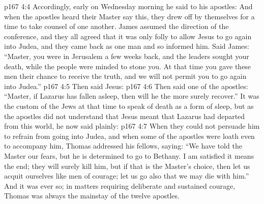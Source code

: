 \vs p167 4:4 \pc Accordingly, early on Wednesday morning he said to his apostles:  And when the apostles heard their Master say this, they drew off by themselves for a time to take counsel of one another. James assumed the direction of the conference, and they all agreed that it was only folly to allow Jesus to go again into Judea, and they came back as one man and so informed him. Said James: “Master, you were in Jerusalem a few weeks back, and the leaders sought your death, while the people were minded to stone you. At that time you gave these men their chance to receive the truth, and we will not permit you to go again into Judea.”
\vs p167 4:5 Then said Jesus: 
\vs p167 4:6 Then said one of the apostles: “Master, if Lazarus has fallen asleep, then will he the more surely recover.” It was the custom of the Jews at that time to speak of death as a form of sleep, but as the apostles did not understand that Jesus meant that Lazarus had departed from this world, he now said plainly: 
\vs p167 4:7 When they could not persuade him to refrain from going into Judea, and when some of the apostles were loath even to accompany him, Thomas addressed his fellows, saying: “We have told the Master our fears, but he is determined to go to Bethany. I am satisfied it means the end; they will surely kill him, but if that is the Master’s choice, then let us acquit ourselves like men of courage; let us go also that we may die with him.” And it was ever so; in matters requiring deliberate and sustained courage, Thomas was always the mainstay of the twelve apostles.
